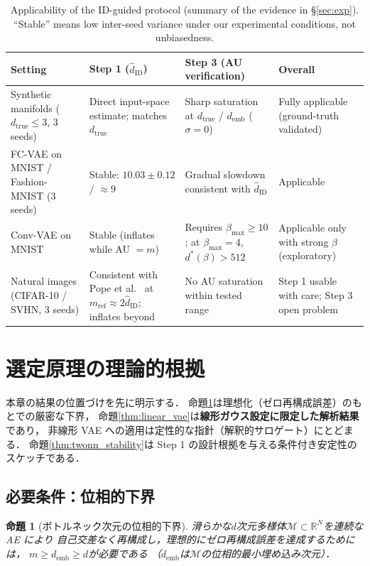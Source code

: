 \documentclass[11pt,a4paper]{jsarticle}
\newtheorem{proposition}{命題}
\newcommand{\hatdID}{\hat{d}_{\mathrm{ID}}}
\newcommand{\dtrue}{d_{\mathrm{true}}}
\newcommand{\R}{\mathbb{R}}
\newcommand{\demb}{d_{\mathrm{emb}}}
\newcommand{\dstar}{d^{*}(\beta)}
\begin{document}
\begin{table}[H]
\centering
\caption{Applicability of the ID-guided protocol (summary of the evidence in
§\ref{sec:exp}). ``Stable'' means low inter-seed variance under our
experimental conditions, not unbiasedness.}
\label{tab:applicability}
\small
\begin{tabular}{p{3.0cm}p{3.2cm}p{3.4cm}p{4.2cm}}
\toprule
Setting & Step 1 ($\hatdID$) & Step 3 (AU verification) & Overall \\
\midrule
Synthetic manifolds ($\dtrue \leq 3$, 3 seeds) & Direct input-space estimate; matches $\dtrue$ & Sharp saturation at $\dtrue$ / $\demb$ ($\sigma = 0$) & Fully applicable (ground-truth validated) \\
\addlinespace
FC-VAE on MNIST / Fashion-MNIST (3 seeds) & Stable: $10.03 \pm 0.12$ / $\approx 9$ & Gradual slowdown consistent with $\hatdID$ & Applicable \\
\addlinespace
Conv-VAE on MNIST & Stable (inflates while AU $= m$) & Requires $\beta_{\max} \geq 10$; at $\beta_{\max} = 4$, $\dstar > 512$ & Applicable only with strong $\beta$ (exploratory) \\
\addlinespace
Natural images (CIFAR-10 / SVHN, 3 seeds) & Consistent with Pope et al.~\cite{pope2021intrinsic} at $m_{\mathrm{ref}} \approx 2\hatdID$; inflates beyond & No AU saturation within tested range & Step 1 usable with care; Step 3 open problem \\
\bottomrule
\end{tabular}
\end{table}

\section{選定原理の理論的根拠}\label{sec:theory}

本章の結果の位置づけを先に明示する．
命題\ref{thm:lower_bound}は理想化（ゼロ再構成誤差）のもとでの厳密な下界，
命題\ref{thm:linear_vae}は\textbf{線形ガウス設定に限定した解析結果}であり，
非線形 VAE への適用は定性的な指針（解釈的サロゲート）にとどまる．
命題\ref{thm:twonn_stability}は Step 1 の設計根拠を与える条件付き安定性のスケッチである．

\subsection{必要条件：位相的下界}\label{sec:theory_lower}

\begin{proposition}[ボトルネック次元の位相的下界]\label{thm:lower_bound}
滑らかな$d$次元多様体$\mathcal{M} \subset \R^N$を連続な AE により
自己交差なく再構成し，理想的にゼロ再構成誤差を達成するためには，
$m \geq \demb \geq d$が必要である
（$\demb$は$\mathcal{M}$の位相的最小埋め込み次元）．
\end{proposition}
\end{document}
